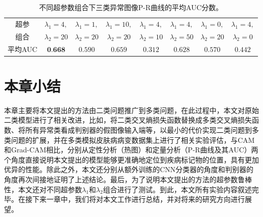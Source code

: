\begin{table}[H]
	\centering
	\caption[不同超参数组合下三类异常图像P-R曲线的平均AUC分数]{不同超参数组合下三类异常图像P-R曲线的平均AUC分数。}
	\label{tab:simulated_skin_diff_parameters}
		\begin{tabular}{c|c|c|c|c|c|c|c}
			\toprule[2pt]
			
			超参& $\lambda_{1}=4,$ & $\lambda_{1}=1,$& $\lambda_{1}=10,$&
			$\lambda_{1}=4,$ & $\lambda_{1}=4,$ &
			$\lambda_{1}=0,$ &
			$\lambda_{1}=4,$\\
			组合		  & 
			$\lambda_{2}=20$ & $\lambda_{2}=20$ &
			$\lambda_{2}=20$ & $\lambda_{2}=10$ & $\lambda_{2}=50$ &
			$\lambda_{2}=20$&
			$\lambda_{2}=0$ \\
			\midrule[2pt]



			平均AUC	& $\textbf{0.668}$ &	$0.590 $ & $0.659$ & $0.312$ & $0.628$& $0.570$ &	$0.442$ \\
			\bottomrule[2pt]
		\end{tabular}
\end{table}
\section{本章小结}
本章主要将本文提出的方法由二类问题推广到多类问题，在此过程中，本文对原始二类模型进行了相关改进，比如，将二类交叉熵损失函数替换成多类交叉熵损失函数、将所有异常类看成判别器的假图像输入端等，以最小的代价实现二类问题到多类问题的扩展，并在多类模拟皮肤病病变数据集上进行了相关实验评估，与CAM和Grad-CAM相比，分别从定性分析（热图）和定量分析（P-R曲线及其AUC）两个角度直接说明本文提出的模型能够更准确地定位到疾病标记物的位置，具有更加优异的性能。除此之外，本文还分别从额外训练的CNN分类器的角度和判别器的角度再次间接地证明了上述结论。最后，为了说明本文提出的方法的超参数鲁棒性，本文还对不同超参数$\lambda_{1}$和$\lambda_{2}$组合进行了测试。到此，本文所有实验内容叙述完毕。在接下来一章中，我们将对本文工作进行总结，并对将来的研究方向进行展望。

